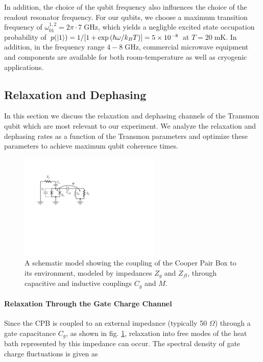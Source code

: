 In addition, the choice of the qubit frequency also influences the choice of the readout resonator frequency. For our qubits, we choose a maximum transition frequency of $\omega_{01}^{1,2}= 2\pi \cdot 7 \;\mathrm{GHz}$, which yields a negligble excited state occupation probability of $p(\left| 1 \right>)=1/[1+\exp{(\hbar \omega / k_B T)}]=5\times 10^{-8}$ at $T=20\;\mathrm{mK}$. In addition, in the frequency range $4-8\;\mathrm{GHz}$, commercial microwave equipment and components are available for both room-temperature as well as cryogenic applications.

\subsection{Relaxation and Dephasing}

In this section we discuss the relaxation and dephasing channels of the Transmon qubit which are most relevant to our experiment. We analyze the relaxation and dephasing rates as a function of the Transmon parameters and optimize these parameters to achieve maximum qubit coherence times.

\begin{figure}
	\centering
	\includegraphics[width=0.6\textwidth]{./material/figures/introduction/cooper_pair_box_decoherence}
	\caption[]{A schematic model showing the coupling of the Cooper Pair Box to its environment, modeled by impedances $Z_g$ and $Z_{fl}$, through capacitive and inductive couplings $C_g$ and $M$.}
	\label{fig:cooper_pair_box_decoherence}
\end{figure}

\paragraph{Relaxation Through the Gate Charge Channel}

Since the CPB is coupled to an external impedance (typically 50 $\Omega$) through a gate capacitance $C_g$, as shown in fig. \ref{fig:cooper_pair_box_decoherence}, relaxation into free modes of the heat bath represented by this impedance can occur. The spectral density of gate charge fluctuations is given as

